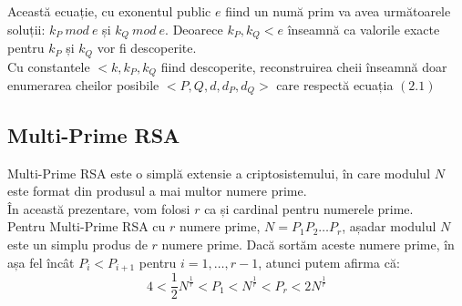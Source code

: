 \documentclass[12]{report}
\begin{document}
Această ecuație, cu exonentul public $e$ fiind un numă prim va avea următoarele soluții: $k_P \ mod \ e$ și $k_Q \ mod \ e$. Deoarece $k_P,k_Q <e$ înseamnă ca valorile exacte pentru $k_P$ și $k_Q$ vor fi descoperite. \\
Cu constantele $<k,k_P,k_Q$ fiind descoperite, reconstruirea cheii înseamnă doar enumerarea cheilor posibile $<P,Q,d,d_P,d_Q>$ care respectă ecuația $(2.1)$


\subsection{Multi-Prime RSA}
Multi-Prime RSA este o simplă extensie a criptosistemului, în care modulul $N$ este format din produsul a mai multor numere prime. \\
În această prezentare, vom folosi $r$ ca și cardinal pentru numerele prime.\\
Pentru Multi-Prime RSA cu $r$ numere prime, $N=P_1 P_2 \dots P_r$, așadar modulul $N$ este un simplu produs de $r$ numere prime. Dacă sortăm aceste numere prime, în așa fel încât $P_i < P_{i+1}$ pentru $i=1, \dots, r-1$, atunci putem afirma că:
\begin{equation}
4<\frac{1}{2}N^{\frac{1}{r}}<P_1<N^{\frac{1}{r}}<P_r <2N^{\frac{1}{r}}
\end{equation}
\end{document}
